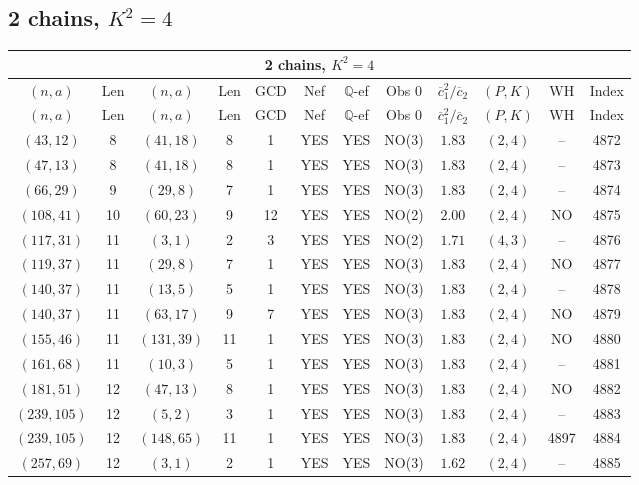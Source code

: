 \subsection{2 chains, $K^2 = 4$}
\begin{longtable}{|c|c|c|c|c|c|c|c|c|c|c|c|}
\hline
\multicolumn{12}{|c|}{2 chains, $K^2 = 4$}\\
\hline
$(n,a)$ & Len & $(n,a)$ & Len & GCD & Nef & $\mathbb Q$-ef & Obs 0 & $\overline c_1^2 / \overline c_2$ & $(P,K)$ & WH & Index\\
\hline
\endfirsthead

\hline
$(n,a)$ & Len & $(n,a)$ & Len & GCD & Nef & $\mathbb Q$-ef & Obs 0 & $\overline c_1^2 / \overline c_2$ & $(P,K)$ & WH & Index\\
\hline
\endhead
\hline
\endfoot

$(43,12)$ & 8 & $(41,18)$ & 8 & 1 & YES & YES & NO(3) & $1.83$ & $(2,4)$ & -- & 4872\\
$(47,13)$ & 8 & $(41,18)$ & 8 & 1 & YES & YES & NO(3) & $1.83$ & $(2,4)$ & -- & 4873\\
$(66,29)$ & 9 & $(29,8)$ & 7 & 1 & YES & YES & NO(3) & $1.83$ & $(2,4)$ & -- & 4874\\
$(108,41)$ & 10 & $(60,23)$ & 9 & 12 & YES & YES & NO(2) & $2.00$ & $(2,4)$ & NO & 4875\\
$(117,31)$ & 11 & $(3,1)$ & 2 & 3 & YES & YES & NO(2) & $1.71$ & $(4,3)$ & -- & 4876\\
$(119,37)$ & 11 & $(29,8)$ & 7 & 1 & YES & YES & NO(3) & $1.83$ & $(2,4)$ & NO & 4877\\
$(140,37)$ & 11 & $(13,5)$ & 5 & 1 & YES & YES & NO(3) & $1.83$ & $(2,4)$ & -- & 4878\\
$(140,37)$ & 11 & $(63,17)$ & 9 & 7 & YES & YES & NO(3) & $1.83$ & $(2,4)$ & NO & 4879\\
$(155,46)$ & 11 & $(131,39)$ & 11 & 1 & YES & YES & NO(3) & $1.83$ & $(2,4)$ & NO & 4880\\
$(161,68)$ & 11 & $(10,3)$ & 5 & 1 & YES & YES & NO(3) & $1.83$ & $(2,4)$ & -- & 4881\\
$(181,51)$ & 12 & $(47,13)$ & 8 & 1 & YES & YES & NO(3) & $1.83$ & $(2,4)$ & NO & 4882\\
$(239,105)$ & 12 & $(5,2)$ & 3 & 1 & YES & YES & NO(3) & $1.83$ & $(2,4)$ & -- & 4883\\
$(239,105)$ & 12 & $(148,65)$ & 11 & 1 & YES & YES & NO(3) & $1.83$ & $(2,4)$ & 4897 & 4884\\
$(257,69)$ & 12 & $(3,1)$ & 2 & 1 & YES & YES & NO(3) & $1.62$ & $(2,4)$ & -- & 4885\\

\end{longtable}
